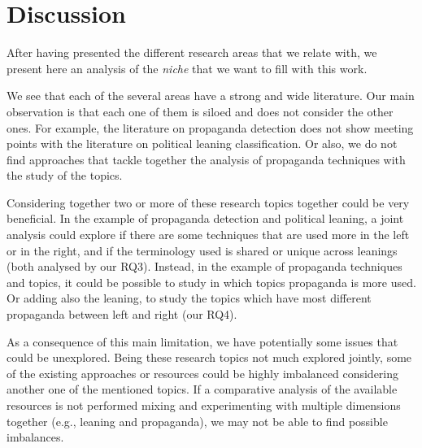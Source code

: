 

\section{\statusgreen Discussion}
\label{sec:lit_discussion}

After having presented the different research areas that we relate with, we present here an analysis of the \emph{niche} that we want to fill with this work.

We see that each of the several areas have a strong and wide literature.
Our main observation is that each one of them is siloed and does not consider the other ones.
For example, the literature on propaganda detection does not show meeting points with the literature on political leaning classification.
Or also, we do not find approaches that tackle together the analysis of propaganda techniques with the study of the topics.

Considering together two or more of these research topics together could be very beneficial.
In the example of propaganda detection and political leaning, a joint analysis could explore if there are some techniques that are used more in the left or in the right, and if the terminology used is shared or unique across leanings (both analysed by our RQ3).
Instead, in the example of propaganda techniques and topics, it could be possible to study in which topics propaganda is more used. Or adding also the leaning, to study the topics which have most different propaganda between left and right (our RQ4). 






As a consequence of this main limitation, we have potentially some issues that could be unexplored.
Being these research topics not much explored jointly, some of the existing approaches or resources could be highly imbalanced considering another one of the mentioned topics.
If a comparative analysis of the available resources is not performed mixing and experimenting with multiple dimensions together (e.g., leaning and propaganda), we may not be able to find possible imbalances.

